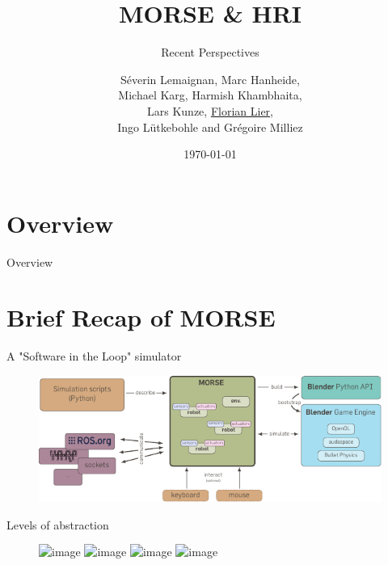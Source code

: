 \documentclass[compress]{beamer}
\title{MORSE \& HRI}
\subtitle{Recent Perspectives}
\date{\today}
\author{Séverin Lemaignan, Marc Hanheide, \\ Michael Karg, Harmish Khambhaita,
\\Lars Kunze, \underline{Florian Lier}, \\Ingo Lütkebohle and Grégoire Milliez}
\begin{document}
\maketitle


\section*{Overview}
\begin{frame}{Overview}
    \tableofcontents[hideallsubsections]
\end{frame}


\section{Brief Recap of MORSE}


\begin{frame}{A "Software in the Loop" simulator}
    \begin{figure}
        \centering
        \includegraphics[width=\linewidth]{morse}
    \end{figure}
\end{frame}

\begin{frame}{Levels of abstraction}
    \begin{figure}
        \centering
        \includegraphics<1>[width=\linewidth]{realism-0}
        \includegraphics<2>[width=\linewidth]{realism-1}
        \includegraphics<3>[width=\linewidth]{realism-2}
        \includegraphics<4>[width=\linewidth]{realism-3}
    \end{figure}
\end{frame}
\end{document}
